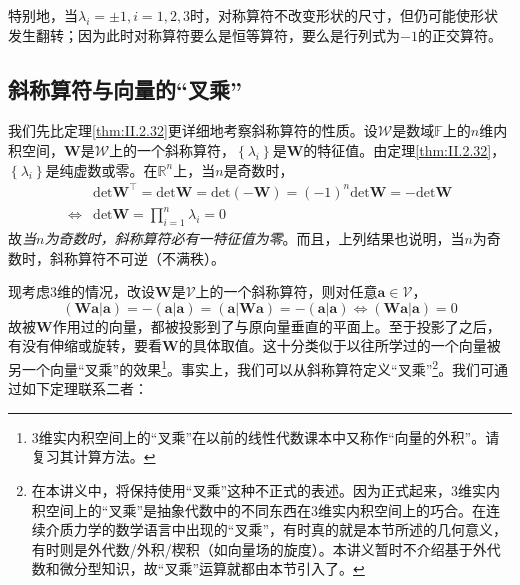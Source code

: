 \documentclass[main.tex]{subfiles}
\begin{document}
特别地，当$\lambda_i=\pm 1,i=1,2,3$时，对称算符不改变形状的尺寸，但仍可能使形状发生翻转；因为此时对称算符要么是恒等算符，要么是行列式为$-1$的正交算符。

\subsection{斜称算符与向量的“叉乘”}
我们先比定理\ref{thm:II.2.32}更详细地考察斜称算符的性质。设$\mathcal{W}$是数域$\mathbb{F}$上的$n$维内积空间，$\mathbf{W}$是$\mathcal{W}$上的一个斜称算符，$\left\{\lambda_i\right\}$是$\mathbf{W}$的特征值。由定理\ref{thm:II.2.32}，$\left\{\lambda_i\right\}$是纯虚数或零。在$\mathbb{R}^n$上，当$n$是奇数时，
\begin{align*}
                    & \mathrm{det}\mathbf{W}^\intercal=\mathrm{det}\mathbf{W}=\mathrm{det}\left(-\mathbf{W}\right)=\left(-1\right)^n\mathrm{det}\mathbf{W}=-\mathrm{det}\mathbf{W} \\
    \Leftrightarrow & \mathrm{det}\mathbf{W}=\prod_{i=1}^n\lambda_i=0
\end{align*}
故\emph{当$n$为奇数时，斜称算符必有一特征值为零}。而且，上列结果也说明，当$n$为奇数时，斜称算符不可逆（不满秩）。

现考虑3维的情况，改设$\mathbf{W}$是$\mathcal{V}$上的一个斜称算符，则对任意$\mathbf{a}\in\mathcal{V}$，
\[\left(\mathbf{Wa}|\mathbf{a}\right)=-\left(\mathbf{a}|\mathbf{a}\right)=\left(\mathbf{a}|\mathbf{Wa}\right)=-\left(\mathbf{a}|\mathbf{a}\right)\Leftrightarrow\left(\mathbf{Wa}|\mathbf{a}\right)=0\]
故被$\mathbf{W}$作用过的向量，都被投影到了与原向量垂直的平面上。至于投影了之后，有没有伸缩或旋转，要看$\mathbf{W}$的具体取值。这十分类似于以往所学过的一个向量被另一个向量“叉乘”的效果\footnote{3维实内积空间上的“叉乘”在以前的线性代数课本中又称作“向量的外积”\cite[\S3.2]{周胜林2012线性代数}。请复习其计算方法。}。事实上，我们可以从斜称算符定义“叉乘”\footnote{在本讲义中，将保持使用“叉乘”这种不正式的表述。因为正式起来，3维实内积空间上的“叉乘”是抽象代数中的不同东西在3维实内积空间上的巧合。在连续介质力学的数学语言中出现的“叉乘”，有时真的就是本节所述的几何意义，有时则是外代数/外积/楔积（如向量场的旋度）。本讲义暂时不介绍基于外代数和微分型知识，故“叉乘”运算就都由本节引入了。}。我们可通过如下定理联系二者：
\end{document}
